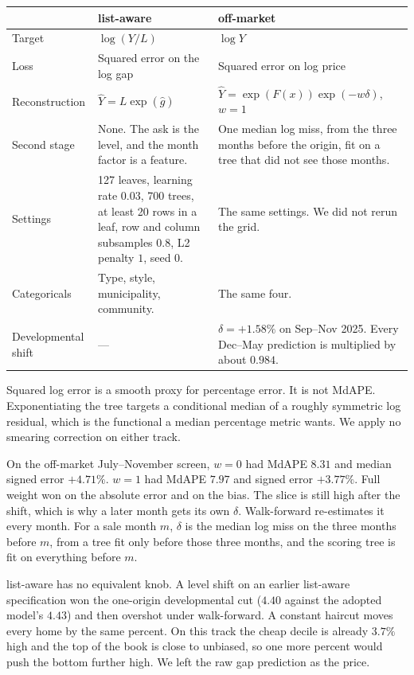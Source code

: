 \documentclass[11pt]{article}
\newcommand{\la}{list-aware}
\newcommand{\om}{off-market}
\begin{document}
\begin{center}
\small
\begin{tabular}{p{3.4cm}p{5.7cm}p{5.5cm}}
\toprule
 & \la & \om \\
\midrule
Target & \(\log(Y/L)\) & \(\log Y\) \\
Loss & Squared error on the log gap & Squared error on log price \\
Reconstruction & \(\hat Y = L\exp(\hat g)\) & \(\hat Y = \exp(F(x))\exp(-w\delta)\), \(w=1\) \\
Second stage & None. The ask is the level, and the month factor is a feature. & One median log miss, from the three months before the origin, fit on a tree that did not see those months. \\
Settings & 127 leaves, learning rate \(0.03\), 700 trees, at least 20 rows in a leaf, row and column subsamples \(0.8\), L2 penalty \(1\), seed \(0\). & The same settings. We did not rerun the grid. \\
Categoricals & Type, style, municipality, community. & The same four. \\
Developmental shift & --- & \(\delta = +1.58\%\) on Sep--Nov 2025. Every Dec--May prediction is multiplied by about \(0.984\). \\
\bottomrule
\end{tabular}
\end{center}

Squared log error is a smooth proxy for percentage error. It is not MdAPE. Exponentiating the tree targets a conditional median of a roughly symmetric log residual, which is the functional a median percentage metric wants. We apply no smearing correction on either track.

On the off-market July--November screen, \(w=0\) had MdAPE \(8.31\) and median signed error \(+4.71\%\). \(w=1\) had MdAPE \(7.97\) and signed error \(+3.77\%\). Full weight won on the absolute error and on the bias. The slice is still high after the shift, which is why a later month gets its own \(\delta\). Walk-forward re-estimates it every month. For a sale month \(m\), \(\delta\) is the median log miss on the three months before \(m\), from a tree fit only before those three months, and the scoring tree is fit on everything before \(m\).

\la{} has no equivalent knob. A level shift on an earlier list-aware specification won the one-origin developmental cut (\(4.40\) against the adopted model's \(4.43\)) and then overshot under walk-forward. A constant haircut moves every home by the same percent. On this track the cheap decile is already \(3.7\%\) high and the top of the book is close to unbiased, so one more percent would push the bottom further high. We left the raw gap prediction as the price.
\end{document}
